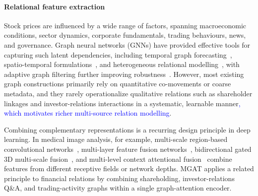 \documentclass[pdflatex,sn-mathphys-num]{sn-jnl}%
\theoremstyle{thmstyleone}%
\theoremstyle{thmstyletwo}%
\theoremstyle{thmstylethree}%
\begin{document}
\paragraph{Relational feature extraction}
 Stock prices are influenced by a wide range of factors, spanning macroeconomic conditions, sector dynamics, corporate fundamentals, trading behaviours, news, and governance. 
Graph neural networks (GNNs) have provided effective tools for capturing such latent dependencies, including temporal graph forecasting~\citep{Zhao2020TGCN}, 
spatio-temporal formulations~\citep{Jafari2022GCNET,Feng2025STGAT}, 
and heterogeneous relational modelling~\citep{Zhao2024RAHGNN,Sun2025GTC,Wu2024MomentumKG}, 
with adaptive graph filtering further improving robustness~\citep{Andrea2023AdaptiveFiltersGCNN}. 
However, most existing graph constructions primarily rely on quantitative co-movements or coarse metadata, and they rarely operationalize qualitative relations such as shareholder linkages and investor-relations interactions in a systematic, learnable manner\textcolor{blue}{, which motivates richer multi-source relation modelling}.
{\color{blue}Combining complementary representations is a recurring design principle in deep learning. In medical image analysis, for example, multi-scale region-based convolutional networks~\citep{Bakkouri2019MSCNN}, multi-layer feature fusion networks~\citep{Bakkouri2020CAD}, bidirectional gated 3D multi-scale fusion~\citep{Bakkouri2022BG3DM2F}, and multi-level context attentional fusion~\citep{Bakkouri2023MLCA2F} combine features from different receptive fields or network depths. MGAT applies a related principle to financial relations by combining shareholding, investor-relations Q\&A, and trading-activity graphs within a single graph-attention encoder.\par}
\end{document}
